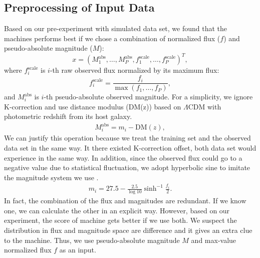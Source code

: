 \documentclass[useamsfonts]{pasj01}
\begin{document}
\subsection{Preprocessing of Input Data}
Based on our pre-experiment with simulated data set, we found that the machines performs best if we 
chose a combination of normalized flux ($f$) and pseudo-absolute magnitude ($M$):
\begin{equation}
    x = \left( M_1^\mathrm{abs}, \ldots, M_P^\mathrm{abs}, f_{1}^{\mathrm{scale}}, \ldots, f_{P}^{\mathrm{scale}} \right)^T,
\end{equation}
where $f_{i}^{\mathrm{scale}}$ is $i$-th raw observed flux normalized by its maximum flux:
\begin{equation}
    f_{i}^{\mathrm{scale}} = \frac{f_i}{\max \left(f_1, \ldots, f_P \right)},    \label{eq:scaled_flux}
\end{equation}
and $M_i^\mathrm{abs}$ is $i$-th pseudo-absolute observed magnitude.
For a simplicity, we ignore K-correction and use distance modulus (DM(z)) based on $\Lambda$CDM with photometric redshift
from its host galaxy.
\begin{eqnarray}
    M_i^\mathrm{abs} = m_i - \mathrm{DM}\left(z\right),
\end{eqnarray}
We can justify this operation because we treat the training set and the observed data set in the same way.
It there existed K-correction offset, both data set would experience in the same way.
In addition, since the observed flux could go to a negative value due to statistical fluctuation, 
we adopt hyperbolic sine to imitate the magnitude system we use \citep{lupton99a}.  
\begin{eqnarray}
    m_i = 27.5 - \frac{2.5}{\log 10} \sinh^{-1} \frac{f_i}{2}. \label{eq:mag} 
\end{eqnarray}
In fact, the combination of the flux and magnitudes are redundant.   If we know one, we can calculate the other
in an explicit way.   
However, based on our experiment, the score of machine gets better if we use both.  
We suspect the distribution in flux and magnitude space are difference and it gives an extra clue to the machine.
Thus, we use pseudo-absolute magnitude $M$ and max-value normalized flux $f$ as an input.
\end{document}
